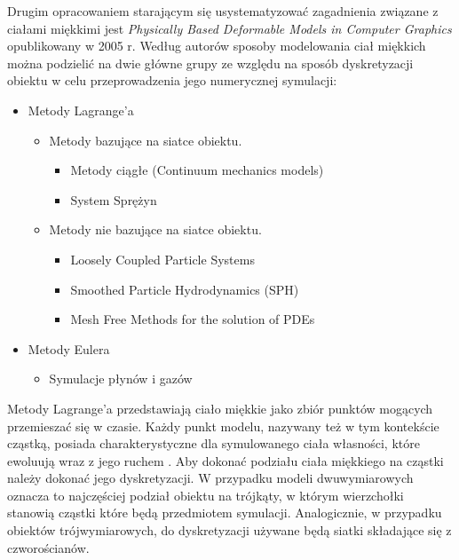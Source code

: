Drugim opracowaniem starającym się usystematyzować zagadnienia związane z
ciałami miękkimi jest \textit{Physically Based Deformable Models in Computer
Graphics} opublikowany w 2005 r. Według autorów sposoby modelowania ciał miękkich można
podzielić na dwie główne grupy ze względu na sposób dyskretyzacji
obiektu w celu przeprowadzenia jego numerycznej symulacji:

\begin{itemize}
\item Metody Lagrange'a
	\begin{itemize}
	\item Metody bazujące na siatce obiektu.
		\begin{itemize}
			\item Metody ciągłe (Continuum mechanics models)
			\item System Sprężyn
		\end{itemize}
	\item Metody nie bazujące na siatce obiektu.
		\begin{itemize}
			\item Loosely Coupled Particle Systems 
			\item Smoothed Particle Hydrodynamics (SPH) 
			\item Mesh Free Methods for the solution of PDEs 
		\end{itemize}
	\end{itemize}
\item Metody Eulera
	\begin{itemize}
		\item Symulacje płynów i gazów
	\end{itemize}
\end{itemize}

Metody Lagrange'a przedstawiają ciało miękkie jako zbiór punktów mogących
przemieszać się w czasie. Każdy punkt modelu, nazywany też w tym kontekście cząstką,
posiada charakterystyczne dla symulowanego ciała własności, które ewoluują wraz z jego ruchem
\cite{pbdo}. Aby dokonać podziału ciała miękkiego na cząstki należy
dokonać jego dyskretyzacji. W przypadku modeli dwuwymiarowych oznacza to
najczęściej podział obiektu na trójkąty, w którym wierzchołki stanowią
cząstki które będą przedmiotem symulacji. Analogicznie, w przypadku obiektów
trójwymiarowych,
do dyskretyzacji używane będą siatki składające się z czworościanów.

